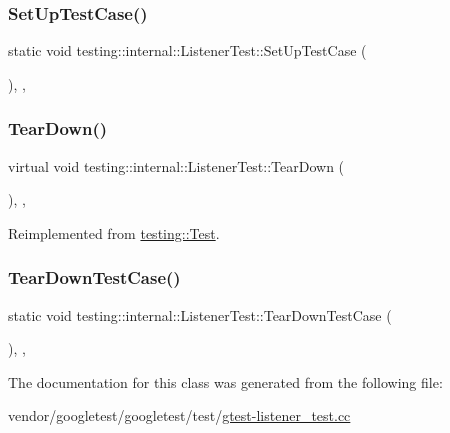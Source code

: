 \subsubsection{\texorpdfstring{Set\+Up\+Test\+Case()}{SetUpTestCase()}}
{\footnotesize\ttfamily static void testing\+::internal\+::\+Listener\+Test\+::\+Set\+Up\+Test\+Case (\begin{DoxyParamCaption}{ }\end{DoxyParamCaption})\hspace{0.3cm}{\ttfamily [inline]}, {\ttfamily [static]}, {\ttfamily [protected]}}

\mbox{\label{classtesting_1_1internal_1_1_listener_test_ad112535025d668e3ea14e71d8741c810}} 
\subsubsection{\texorpdfstring{Tear\+Down()}{TearDown()}}
{\footnotesize\ttfamily virtual void testing\+::internal\+::\+Listener\+Test\+::\+Tear\+Down (\begin{DoxyParamCaption}{ }\end{DoxyParamCaption})\hspace{0.3cm}{\ttfamily [inline]}, {\ttfamily [protected]}, {\ttfamily [virtual]}}



Reimplemented from \hyperlink{classtesting_1_1_test_a5f0ab439802cbe0ef7552f1a9f791923}{testing\+::\+Test}.

\mbox{\label{classtesting_1_1internal_1_1_listener_test_aa35b5f1c6235f0fe98aa2c7f35bb8fe1}} 
\subsubsection{\texorpdfstring{Tear\+Down\+Test\+Case()}{TearDownTestCase()}}
{\footnotesize\ttfamily static void testing\+::internal\+::\+Listener\+Test\+::\+Tear\+Down\+Test\+Case (\begin{DoxyParamCaption}{ }\end{DoxyParamCaption})\hspace{0.3cm}{\ttfamily [inline]}, {\ttfamily [static]}, {\ttfamily [protected]}}



The documentation for this class was generated from the following file\+:\begin{DoxyCompactItemize}
\item 
vendor/googletest/googletest/test/\hyperlink{gtest-listener__test_8cc}{gtest-\/listener\+\_\+test.\+cc}\end{DoxyCompactItemize}
